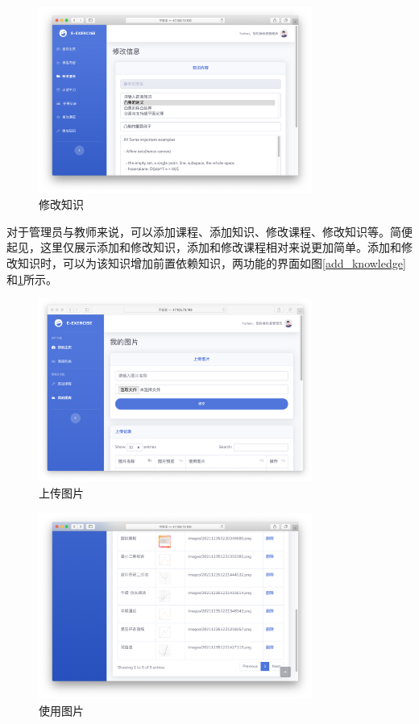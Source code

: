 \documentclass{nwafucoursepaper}
\begin{document}
\begin{figure}[htp]
  \centering
  \includegraphics[width=0.8\textwidth]{modify_knowledge.png}
  \caption{修改知识}
  \label{modify_knowledge}
\end{figure}

对于管理员与教师来说，可以添加课程、添加知识、修改课程、修改知识等。简便起见，这里仅展示添加和修改知识，添加和修改课程相对来说更加简单。添加和修改知识时，可以为该知识增加前置依赖知识，两功能的界面如图\ref{add_knowledge}和\ref{modify_knowledge}所示。

\begin{figure}[htp]
  \centering
  \includegraphics[width=0.8\textwidth]{add_image.png}
  \caption{上传图片}
  \label{add_image}
\end{figure}

\begin{figure}[htp]
  \centering
  \includegraphics[width=0.8\textwidth]{use_image.png}
  \caption{使用图片}
  \label{use_image}
\end{figure}
\end{document}
